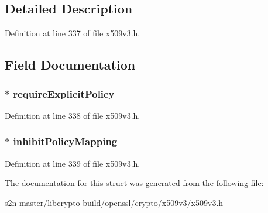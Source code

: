 \subsection{Detailed Description}


Definition at line 337 of file x509v3.\+h.



\subsection{Field Documentation}
\subsubsection[{\texorpdfstring{require\+Explicit\+Policy}{requireExplicitPolicy}}]{ $\ast$ require\+Explicit\+Policy}\hypertarget{struct_p_o_l_i_c_y___c_o_n_s_t_r_a_i_n_t_s__st_a5ce9b26a023809363f71537169d803e3}{}\label{struct_p_o_l_i_c_y___c_o_n_s_t_r_a_i_n_t_s__st_a5ce9b26a023809363f71537169d803e3}


Definition at line 338 of file x509v3.\+h.

\subsubsection[{\texorpdfstring{inhibit\+Policy\+Mapping}{inhibitPolicyMapping}}]{ $\ast$ inhibit\+Policy\+Mapping}\hypertarget{struct_p_o_l_i_c_y___c_o_n_s_t_r_a_i_n_t_s__st_a5e04c8ec615246f32aa32c1b5036b7d4}{}\label{struct_p_o_l_i_c_y___c_o_n_s_t_r_a_i_n_t_s__st_a5e04c8ec615246f32aa32c1b5036b7d4}


Definition at line 339 of file x509v3.\+h.



The documentation for this struct was generated from the following file\+:\begin{DoxyCompactItemize}
\item 
s2n-\/master/libcrypto-\/build/openssl/crypto/x509v3/\hyperlink{crypto_2x509v3_2x509v3_8h}{x509v3.\+h}\end{DoxyCompactItemize}
